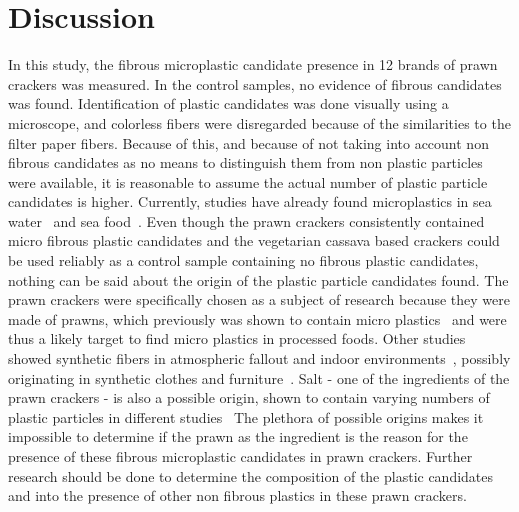 \documentclass[11pt]{article}
\begin{document}
    \section{Discussion}
        In this study, the fibrous microplastic candidate presence in 12 brands of prawn crackers was measured.
        In the control samples, no evidence of fibrous candidates was found.
        Identification of plastic candidates was done visually using a microscope, and colorless fibers were disregarded because of the similarities to the filter paper fibers.
        Because of this, and because of not taking into account non fibrous candidates as no means to distinguish them from non plastic particles were available, it is reasonable to assume the actual number of plastic particle candidates is higher.
        Currently, studies have already found microplastics in sea water~\cite{woodall2014deep,van2013microplastic} and sea food~\cite{efsa2016presence}.
        Even though the prawn crackers consistently contained micro fibrous plastic candidates and the vegetarian cassava based crackers could be used reliably as a control sample containing no fibrous plastic candidates, nothing can be said about the origin of the plastic particle candidates found.
        The prawn crackers were specifically chosen as a subject of research because they were made of prawns, which previously was shown to contain micro plastics~\cite{abbasi2018microplastics} and were thus a likely target to find micro plastics in processed foods.
        Other studies showed synthetic fibers in atmospheric fallout and indoor environments~\cite{dris2017first}, possibly originating in synthetic clothes and furniture~\cite{dris2017first}.
        Salt - one of the ingredients of the prawn crackers - is also a possible origin, shown to contain varying numbers of plastic particles in different studies~\cite{yang2015microplastic,karami2017presence}
        The plethora of possible origins makes it impossible to determine if the prawn as the ingredient is the reason for the presence of these fibrous microplastic candidates in prawn crackers.
        Further research should be done to determine the composition of the plastic candidates and into the presence of other non fibrous plastics in these prawn crackers.
\end{document}
